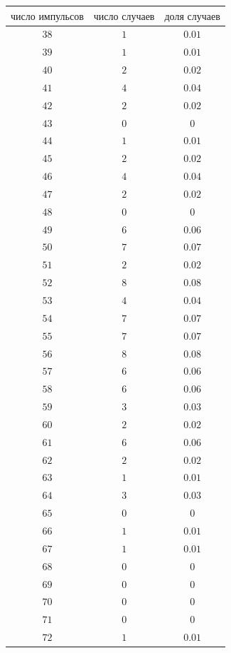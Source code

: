 \documentclass[a4paper,12pt]{article} %
\begin{document}
\begin{tabular}{ | c | c | c |}
\hline
$\textbf{число импульсов}$ & $\textbf{число случаев}$ & $\textbf{доля случаев}$\\ \hline
$38$ & $1$ & $0.01$\\ \hline
$39$ & $1$ & $0.01$\\ \hline
$40$ & $2$ & $0.02$\\ \hline
$41$ & $4$ & $0.04$\\ \hline
$42$ & $2$ & $0.02$\\ \hline
$43$ & $0$ & $0$\\ \hline
$44$ & $1$ & $0.01$\\ \hline
$45$ & $2$ & $0.02$\\ \hline
$46$ & $4$ & $0.04$\\ \hline
$47$ & $2$ & $0.02$\\ \hline
$48$ & $0$ & $0$\\ \hline
$49$ & $6$ & $0.06$\\ \hline
$50$ & $7$ & $0.07$\\ \hline
$51$ & $2$ & $0.02$\\ \hline
$52$ & $8$ & $0.08$\\ \hline
$53$ & $4$ & $0.04$\\ \hline
$54$ & $7$ & $0.07$\\ \hline
$55$ & $7$ & $0.07$\\ \hline
$56$ & $8$ & $0.08$\\ \hline
$57$ & $6$ & $0.06$\\ \hline
$58$ & $6$ & $0.06$\\ \hline
$59$ & $3$ & $0.03$\\ \hline
$60$ & $2$ & $0.02$\\ \hline
$61$ & $6$ & $0.06$\\ \hline
$62$ & $2$ & $0.02$\\ \hline
$63$ & $1$ & $0.01$\\ \hline
$64$ & $3$ & $0.03$\\ \hline
$65$ & $0$ & $0$\\ \hline
$66$ & $1$ & $0.01$\\ \hline
$67$ & $1$ & $0.01$\\ \hline
$68$ & $0$ & $0$\\ \hline
$69$ & $0$ & $0$\\ \hline
$70$ & $0$ & $0$\\ \hline
$71$ & $0$ & $0$\\ \hline
$72$ & $1$ & $0.01$\\
\hline 
\end{tabular}\\
\end{document}
